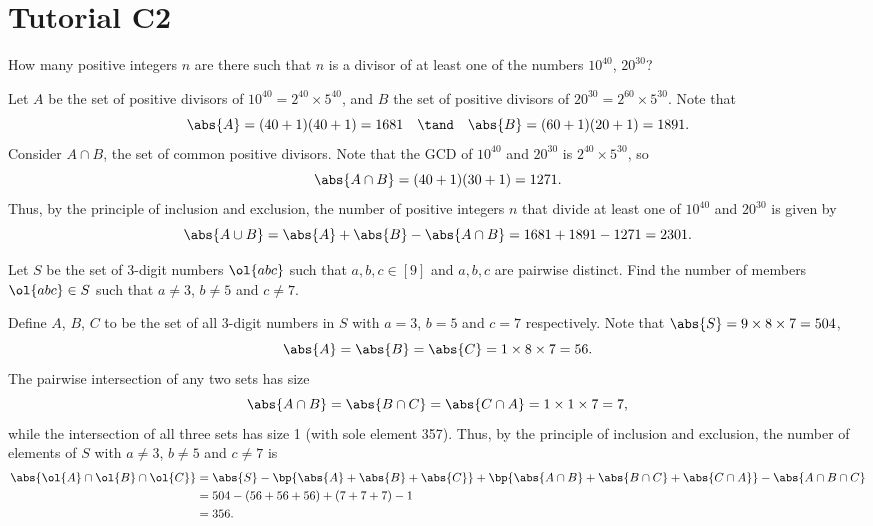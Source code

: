 \section{Tutorial C2}

\begin{problem}
    How many positive integers $n$ are there such that $n$ is a divisor of at least one of the numbers $10^{40}$, $20^{30}$?
\end{problem}
\begin{solution}
    Let $A$ be the set of positive divisors of $10^{40} = 2^{40} \times 5^{40}$, and $B$ the set of positive divisors of $20^{30} = 2^{60} \times 5^{30}$. Note that \[\abs{A} = (40+1)(40+1) = 1681 \quad \tand \quad \abs{B} = (60+1)(20+1) = 1891.\] Consider $A \cap B$, the set of common positive divisors. Note that the GCD of $10^{40}$ and $20^{30}$ is $2^{40} \times 5^{30}$, so \[\abs{A \cap B} = (40+1)(30+1) = 1271.\] Thus, by the principle of inclusion and exclusion, the number of positive integers $n$ that divide at least one of $10^{40}$ and $20^{30}$ is given by \[\abs{A \cup B} = \abs{A} + \abs{B} - \abs{A \cap B} = 1681 + 1891 - 1271 = 2301.\]
\end{solution}

\begin{problem}
    Let $S$ be the set of 3-digit numbers $\ol{abc}$ such that $a, b, c \in [9]$ and $a, b, c$ are pairwise distinct. Find the number of members $\ol{abc} \in S$ such that $a \neq 3$, $b \neq 5$ and $c \neq 7$.
\end{problem}
\begin{solution}
    Define $A$, $B$, $C$ to be the set of all 3-digit numbers in $S$ with $a = 3$, $b = 5$ and $c = 7$ respectively. Note that $\abs{S} = 9\times8\times7 = 504$, \[\abs{A} = \abs{B} = \abs{C} = 1 \times 8 \times 7 = 56.\] The pairwise intersection of any two sets has size \[\abs{A \cap B} = \abs{B \cap C} = \abs{C \cap A} = 1 \times 1 \times 7 = 7,\] while the intersection of all three sets has size 1 (with sole element 357). Thus, by the principle of inclusion and exclusion, the number of elements of $S$ with $a \neq 3$, $b \neq 5$ and $c \neq 7$ is
    \begin{align*}
        \abs{\ol{A} \cap \ol{B} \cap \ol{C}} &= \abs{S} - \bp{\abs{A} + \abs{B} + \abs{C}} + \bp{\abs{A \cap B} + \abs{B \cap C} + \abs{C \cap A}} - \abs{A \cap B \cap C}\\
        &= 504 - (56 + 56 + 56) + (7 + 7 + 7) - 1\\
        &= 356.
    \end{align*}
\end{solution}

